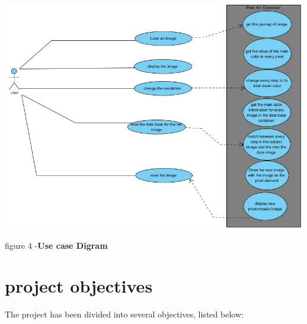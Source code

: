 \documentclass[a4paper,12pt]{report}
\begin{document}
		
	\begin{center}
		\includegraphics[width=15cm, height=10cm, 
		keepaspectratio]{UseCase} 
		
		{figure 4 -\textbf{Use case Digram}}\\
	\end{center}
	\vspace*{2cm}
	
	
	\section{project objectives}
	


	The project has been divided into several objectives, listed below:
	
\end{document}
